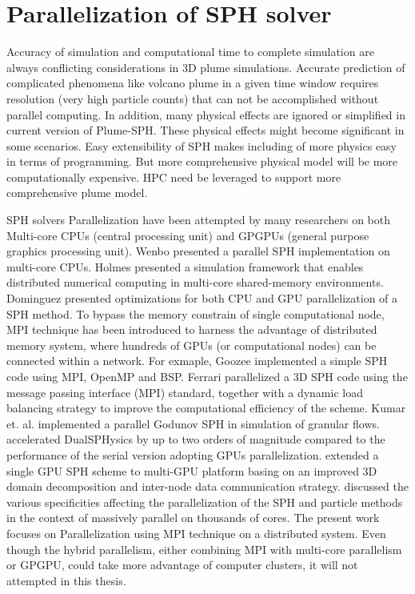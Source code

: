 \section{Parallelization of SPH solver}

Accuracy of simulation and computational time to complete simulation are always conflicting considerations in 3D plume simulations. Accurate prediction of complicated phenomena like volcano plume in a given time window requires resolution (very high particle counts) that can not be accomplished without parallel computing. In addition, many physical effects are ignored or simplified in current version of Plume-SPH. These physical effects might become significant in some scenarios. Easy extensibility of SPH makes including of more physics easy in terms of programming. But more comprehensive physical model will be more computationally expensive. HPC need be leveraged to support more comprehensive plume model.

SPH solvers Parallelization have been attempted by many researchers on both Multi-core CPUs (central processing unit) and GPGPUs (general purpose graphics processing unit). Wenbo \cite{wenbo2014performance} presented a parallel SPH implementation on multi-core CPUs. Holmes \cite{holmes2011framework} presented a simulation framework that enables distributed numerical computing in multi-core shared-memory environments. Dominguez \cite{dominguez2011optimization} presented optimizations for both CPU and GPU parallelization of a SPH method. To bypass the memory constrain of single computational node, MPI technique has been introduced to harness the advantage of distributed memory system, where hundreds of GPUs (or computational nodes) can be connected within a network. For exmaple, Goozee \cite{goozee2003distributed} implemented a simple SPH code using MPI, OpenMP and BSP. 
Ferrari \cite{ferrari2009new} parallelized a 3D SPH code using the message passing interface (MPI) standard, together with a dynamic load balancing strategy to improve the computational efficiency of the scheme. Kumar et. al. \cite{kumar2013parallel} implemented a parallel Godunov SPH in simulation of granular flows. \citet{crespo2015dualsphysics} accelerated DualSPHysics by up to two orders of magnitude compared to the performance of the serial version adopting GPUs parallelization. \citet{ji2016large} 
extended a single GPU SPH scheme to multi-GPU platform basing on an improved 3D domain decomposition and inter-node data communication strategy. \citet{oger2016distributed} discussed the various specificities affecting the parallelization of the SPH and particle methods in the context of massively parallel on thousands of cores.
The present work focuses on Parallelization using MPI technique on a distributed system. Even though the hybrid parallelism, either combining MPI with multi-core parallelism or GPGPU, could take more advantage of computer clusters, it will not attempted in this thesis.

